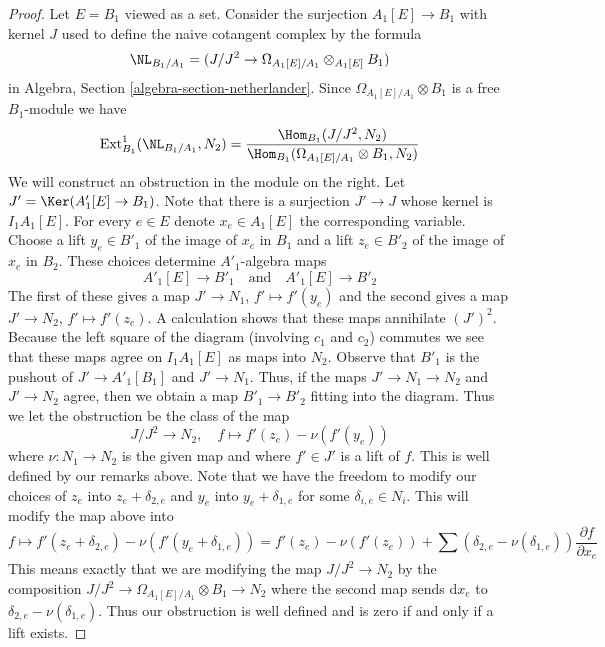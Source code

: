 \begin{proof}
Let $E = B_1$ viewed as a set.
Consider the surjection $A_1[E] \to B_1$ with kernel $J$ used
to define the naive cotangent complex by the formula
$$
\NL_{B_1/A_1} = (J/J^2 \to \Omega_{A_1[E]/A_1} \otimes_{A_1[E]} B_1)
$$
in
Algebra, Section \ref{algebra-section-netherlander}.
Since $\Omega_{A_1[E]/A_1} \otimes B_1$ is a free
$B_1$-module we have
$$
\text{Ext}^1_{B_1}(\NL_{B_1/A_1}, N_2) =
\frac{\Hom_{B_1}(J/J^2, N_2)}
{\Hom_{B_1}(\Omega_{A_1[E]/A_1} \otimes B_1, N_2)}
$$
We will construct an obstruction in the module on the right.
Let $J' = \Ker(A'_1[E] \to B_1)$. Note that there is a surjection
$J' \to J$ whose kernel is $I_1A_1[E]$.
For every $e \in E$ denote $x_e \in A_1[E]$ the corresponding variable.
Choose a lift $y_e \in B'_1$ of the image of $x_e$ in $B_1$ and
a lift $z_e \in B'_2$ of the image of $x_e$ in $B_2$.
These choices determine $A'_1$-algebra maps
$$
A'_1[E] \to B'_1 \quad\text{and}\quad A'_1[E] \to B'_2
$$
The first of these gives a map $J' \to N_1$, $f' \mapsto f'(y_e)$
and the second gives a map $J' \to N_2$, $f' \mapsto f'(z_e)$.
A calculation shows that these maps annihilate $(J')^2$.
Because the left square of the diagram (involving $c_1$ and $c_2$)
commutes we see that these maps agree on $I_1A_1[E]$ as maps into $N_2$.
Observe that $B'_1$ is the pushout of $J' \to A'_1[B_1]$ and $J' \to N_1$. 
Thus, if the maps $J' \to N_1 \to N_2$ and $J' \to N_2$ agree, then we
obtain a map $B'_1 \to B'_2$ fitting into the diagram.
Thus we let the obstruction be the class of the map
$$
J/J^2 \to N_2,\quad f \mapsto f'(z_e) - \nu(f'(y_e))
$$
where $\nu : N_1 \to N_2$ is the given map and where $f' \in J'$
is a lift of $f$. This is well defined by our remarks above.
Note that we have the freedom
to modify our choices of $z_e$ into $z_e + \delta_{2, e}$
and $y_e$ into $y_e + \delta_{1, e}$ for some $\delta_{i, e} \in N_i$.
This will modify the map above into
$$
f \mapsto f'(z_e + \delta_{2, e}) - \nu(f'(y_e + \delta_{1, e})) =
f'(z_e) - \nu(f'(z_e)) +
\sum (\delta_{2, e} - \nu(\delta_{1, e}))\frac{\partial f}{\partial x_e}
$$
This means exactly that we are modifying the map $J/J^2 \to N_2$
by the composition $J/J^2 \to \Omega_{A_1[E]/A_1} \otimes B_1 \to N_2$
where the second map sends $\text{d}x_e$ to
$\delta_{2, e} - \nu(\delta_{1, e})$. Thus our obstruction is well defined
and is zero if and only if a lift exists.


\end{proof}
